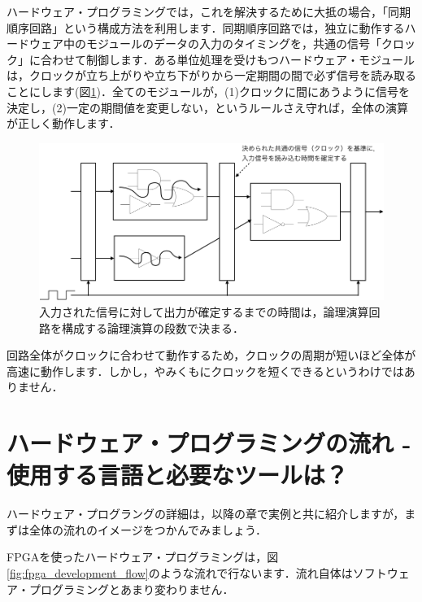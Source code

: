 \documentclass[a4paper,dvipdfmx]{jsarticle}
\begin{document}
ハードウェア・プログラミングでは，これを解決するために大抵の場合，「同期順序回路」という構成方法を利用します．同期順序回路では，独立に動作するハードウェア中のモジュールのデータの入力のタイミングを，共通の信号「クロック」に合わせて制御します．ある単位処理を受けもつハードウェア・モジュールは，クロックが立ち上がりや立ち下がりから一定期間の間で必ず信号を読み取ることにします(図\ref{fig:sync_logic_timing})．全てのモジュールが，(1)クロックに間にあうように信号を決定し，(2)一定の期間値を変更しない，というルールさえ守れば，全体の演算が正しく動作します．

 \begin{figure}[H]
  \begin{center}
   \includegraphics[width=.8\textwidth]{chapter01_figures/sync_logic_timing.png}
  \end{center}
  \caption{入力された信号に対して出力が確定するまでの時間は，論理演算回路を構成する論理演算の段数で決まる．\label{fig:sync_logic_timing}}
 \end{figure}


回路全体がクロックに合わせて動作するため，クロックの周期が短いほど全体が高速に動作します．しかし，やみくもにクロックを短くできるというわけではありません．

\section{ハードウェア・プログラミングの流れ - 使用する言語と必要なツールは？}
ハードウェア・プログラングの詳細は，以降の章で実例と共に紹介しますが，まずは全体の流れのイメージをつかんでみましょう．

FPGAを使ったハードウェア・プログラミングは，図\ref{fig:fpga_development_flow}のような流れで行ないます．流れ自体はソフトウェア・プログラミングとあまり変わりません．
\end{document}
